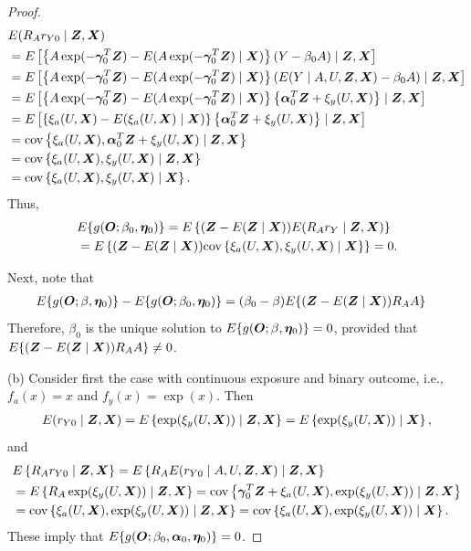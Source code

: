 \documentclass[12pt]{article}
\begin{document}
{\begin{proof}
\begin{align*}
	&E(R_Ar_{Y0} \mid \bm{Z}, \bm{X}) \\
	&= E\left[  \left\{ A\exp(-\bm\gamma_0^T\bm{Z}) - E( A\exp(-\bm \gamma_0^T \bm{Z} )\mid\bm{X})  \right\} (Y-\beta_0 A)  \mid \bm{Z}, \bm{X} \right] \\
	&=E\left[  \left\{ A\exp(-\bm\gamma_0^T\bm{Z}) - E( A\exp(-\bm \gamma_0^T \bm{Z} )\mid\bm{X})  \right\} (E(Y\mid A, U, \bm{Z},\bm{X})-\beta_0 A)  \mid \bm{Z}, \bm{X} \right] \\
	&= E\left[  \left\{ A\exp(-\bm\gamma_0^T\bm{Z}) - E( A\exp(-\bm \gamma_0^T \bm{Z} )\mid\bm{X})  \right\} \left\{ \bm\alpha_0^T \bm{Z}+ \xi_y(U, \bm{X})\right\}  \mid \bm{Z}, \bm{X} \right] \\
	&= E\left[  \left\{ \xi_a(U, \bm{X})- E( \xi_a(U, \bm{X}) \mid\bm{X})  \right\} \left\{ \bm\alpha_0^T \bm{Z}+ \xi_y(U, \bm{X})\right\}  \mid \bm{Z}, \bm{X} \right] \\
	&= \text{cov} \left\{ \xi_a(U, \bm{X}), \bm\alpha_0^T \bm{Z}+ \xi_y(U, \bm{X}) \mid \bm{Z}, \bm{X} \right\} \\
	&=  \text{cov} \left\{ \xi_a(U, \bm{X}),  \xi_y(U, \bm{X}) \mid \bm{Z}, \bm{X} \right\} \\
	&=  \text{cov} \left\{ \xi_a(U, \bm{X}),  \xi_y(U, \bm{X}) \mid \bm{X} \right\} .
\end{align*}
Thus, 
\begin{align*}
&E\{ g(\bm O; \beta_0 ,\bm \eta_0)\} =  E\left\{  (\bm{Z}- E(\bm{Z}\mid \bm{X})) E(R_Ar_Y\mid \bm{Z}, \bm{X}) \right\} \\
&= E\left\{  (\bm{Z}- E(\bm{Z}\mid \bm{X}))  \text{cov} \left\{ \xi_a(U, \bm{X}),  \xi_y(U, \bm{X}) \mid \bm{X} \right\} \right\} = 0. 
\end{align*}

Next, note that
\begin{align*}
&E\{ g(\bm O; \beta ,\bm \eta_0)\} - E\{ g(\bm O; \beta_0 ,\bm \eta_0)\}  =(\beta_0-\beta) E\{ (\bm{Z}- E(\bm{Z}\mid \bm{X}) ) R_A A\}
\end{align*}
Therefore, $ \beta_0 $ is the unique solution to $E\{ g(\bm O; \beta ,\bm \eta_0)\} =0 $, provided that $ E\{ (\bm{Z}- E(\bm{Z}\mid \bm{X}) ) R_A A\}\neq 0  $.

(b) Consider first the case with continuous exposure and binary outcome, i.e., $ f_a(x)=x $ and $ f_y(x)= \exp(x) $. Then 
\begin{align*}
	E(r_{Y0}\mid \bm{Z}, \bm{X}) = E \left\{\exp(\xi_y (U, \bm{X})) \mid \bm{Z}, \bm{X}\right\} = E \left\{\exp(\xi_y (U, \bm{X})) \mid \bm{X}\right\} ,
\end{align*}
and 
\begin{align*}
	&E\left\{  R_Ar_{Y0}\mid \bm{Z}, \bm{X} \right\}  = 	E\left\{  R_A E (r_{Y0} \mid A, U, \bm{Z}, \bm{X}) \mid \bm{Z}, \bm{X} \right\} \\
	& = E\left\{  R_A \exp(\xi_y(U, \bm{X})) \mid \bm{Z}, \bm{X} \right\}   = \text{cov}\left\{ \bm\gamma_0^T \bm{Z} + \xi_a(U, \bm{X}),  \exp(\xi_y(U, \bm{X})) \mid \bm{Z}, \bm{X} \right\}\\
	&=  \text{cov}\left\{ \xi_a(U, \bm{X}),  \exp(\xi_y(U, \bm{X})) \mid \bm{Z}, \bm{X} \right\}  =  \text{cov}\left\{ \xi_a(U, \bm{X}),  \exp(\xi_y(U, \bm{X})) \mid\bm{X} \right\} .
\end{align*}
These imply that $ E\{ g(\bm O; \beta_0, \bm\alpha_0, \bm \eta_0)\}=0$. 


\end{proof}}
\end{document}
